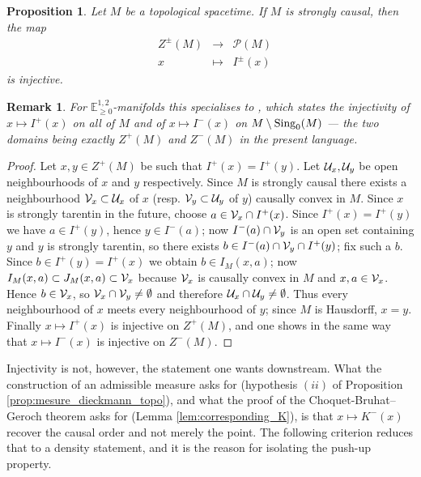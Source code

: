 \documentclass[a4paper,twoside]{article}
\newcommand{\fonctionn}[4]{
	\displaystyle\begin{array}{l|rcl}
	& \displaystyle #1 & \longrightarrow & \displaystyle #2 \\
    & \displaystyle #3 & \longmapsto & \displaystyle #4 \end{array}
}
\newcommand{\mass}[1]{\mathbb{E}^{1,2}_{#1}}
\newtheorem{prop}[lem]{Proposition}
\newtheorem{rem}[lem]{Remark}
\begin{document}
\begin{prop} \label{prop:FZenon_injectif}Let $M$ be a topological spacetime. If $M$ is strongly causal, then
the map $$\fonctionn{Z^\pm(M)}{\mathcal{P}(M)}{x}{I^\pm(x)}$$
is injective.
\end{prop}
\begin{rem}\label{rem:manifolds_specialises_brunswic_cauchy}
For $\mass{\geq0}$-manifolds this specialises to \cite[Prop.~1.10]{brunswic2021cauchy}, which states the injectivity of $x\mapsto I^+(x)$ on all of $M$ and of $x\mapsto I^-(x)$ on $M\setminus \mathrm{Sing}_0(M)$ --- the two domains being exactly $Z^+(M)$ and $Z^-(M)$ in the present language.
\end{rem}
\begin{proof}
Let $x,y\in Z^+(M)$ be such that $I^+(x)=I^+(y)$. Let $\mathcal{U}_x,\mathcal{U}_y$ be open neighbourhoods
of $x$ and $y$ respectively. Since $M$ is strongly causal
there exists a neighbourhood $\mathcal V_x\subset \mathcal{U}_x$ of $x$ (resp. $\mathcal V_y\subset \mathcal{U}_y$ of $y$) causally convex in $M$.
Since $x$ is strongly tarentin in the future, choose $a\in \mathcal V_x\cap I^+(x)$.
Since $I^+(x)=I^+(y)$ we have $a\in I^+(y)$, hence $y\in I^-(a)$; now $I^-(a)\cap \mathcal V_y$ is an open set containing $y$
and $y$ is strongly tarentin, so there exists $b\in I^-(a)\cap \mathcal V_y \cap I^+(y)$; fix such a $b$.
Since $b\in I^+(y)=I^+(x)$ we obtain $b\in I_M(x,a)$; now $I_M(x,a)\subset J_M(x,a) \subset \mathcal V_x$ because $\mathcal V_x$
is causally convex in $M$ and $x,a\in \mathcal V_x$. Hence $b\in \mathcal V_x$, so $\mathcal V_x\cap \mathcal V_y\neq \emptyset$
and therefore $\mathcal{U}_x\cap \mathcal{U}_y\neq \emptyset$.
Thus every neighbourhood of $x$ meets every neighbourhood of $y$; since $M$ is Hausdorff, $x=y$.
Finally $x\mapsto I^+(x)$ is injective on $Z^+(M)$, and one shows in the same way that
$x\mapsto I ^-(x)$ is injective on $Z^-(M)$.
\end{proof}

Injectivity is not, however, the statement one wants downstream. What the construction of an
admissible measure asks for (hypothesis $(ii)$ of Proposition \ref{prop:mesure_dieckmann_topo}), and
what the proof of the Choquet-Bruhat--Geroch theorem asks for (Lemma \ref{lem:corresponding_K}), is
that $x\mapsto K^-(x)$ recover the causal order and not merely the point. The following criterion
reduces that to a density statement, and it is the reason for isolating the push-up property.
\end{document}
